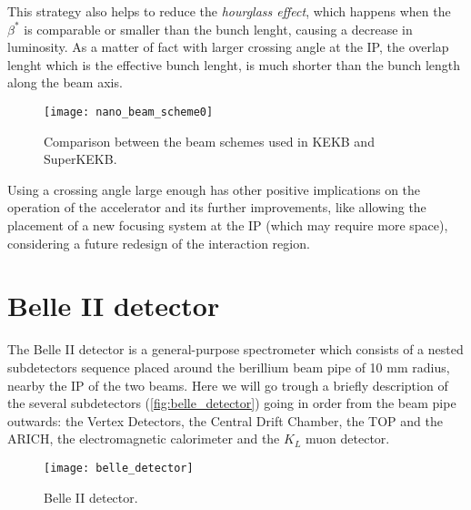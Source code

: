 This strategy also helps to reduce the \textit{hourglass effect}, which happens when the $\beta^{*}$ is comparable or smaller than the bunch lenght, causing a decrease in luminosity. As a matter of fact with larger crossing angle at the IP, the overlap lenght which is the effective bunch lenght, is much shorter than the bunch length along the beam axis. \\


\begin{figure}[h!]
\centering
\texttt{[image: nano\_beam\_scheme0]}
\caption{Comparison between the beam schemes used in KEKB and SuperKEKB.}
\label{fig:beam_scheme_comparison}
\end{figure}

Using a crossing angle large enough has other positive implications on the operation of the accelerator and its further improvements, like allowing the placement of a new focusing system at the IP (which may require more space), considering a future redesign of the interaction region.

\begin{comment}
In~\autoref{fig:beampar} are reported the main machine parameters (default value) of the SuperKEKB accelerator.

\begin{figure}[h!]
\centering
\texttt{[image: beam\_par]}
\caption{Machine parameters of SuperKEKB. The mark ''*'' indicate values in the IP.}
\label{fig:beampar}
\end{figure}
\end{comment}


\section{Belle II detector}


The Belle II detector is a general-purpose spectrometer which consists of a nested subdetectors sequence placed around the berillium beam pipe of 10 mm radius, nearby the IP of the two beams. Here we will go trough a briefly description of the several subdetectors (\autoref{fig:belle_detector}) going in order from the beam pipe outwards: the Vertex Detectors, the Central Drift Chamber, the TOP and the ARICH, the electromagnetic calorimeter and the $K_{L}$ muon detector.

\begin{figure}[h!]
\centering
\texttt{[image: belle\_detector]}
\caption{Belle II detector.}
\label{fig:belle_detector}
\end{figure}


